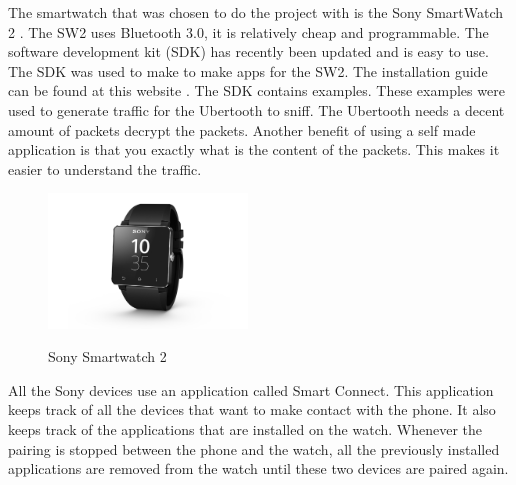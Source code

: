 \label{subsec:sw2}
The smartwatch that was chosen to do the project with is the Sony SmartWatch 2 \cite{sw2}. The SW2 uses Bluetooth 3.0, it is relatively cheap and programmable. The software development kit (SDK) has recently been updated and is easy to use. The SDK was used to make to make apps for the SW2. The installation guide can be found at this website \cite{sw2getstarted}. The SDK contains examples. These examples were used to generate traffic for the Ubertooth to sniff. The Ubertooth needs a decent amount of packets decrypt the packets. Another benefit of using a self made application is that you exactly what is the content of the packets. This makes it easier to understand the traffic.
\begin{figure}[!h]
  \begin{center}
	\includegraphics[width=200px]{images/sw2.jpg}
	\label{fig:sw2}
	\caption{Sony Smartwatch 2}
  \end{center}
\end{figure}
\newpage
All the Sony devices use an application called Smart Connect. This application keeps track of all the devices that want to make contact with the phone. It also keeps track of the applications that are installed on the watch. Whenever the pairing is stopped between the phone and the watch, all the previously installed applications are removed from the watch until these two devices are paired again.

